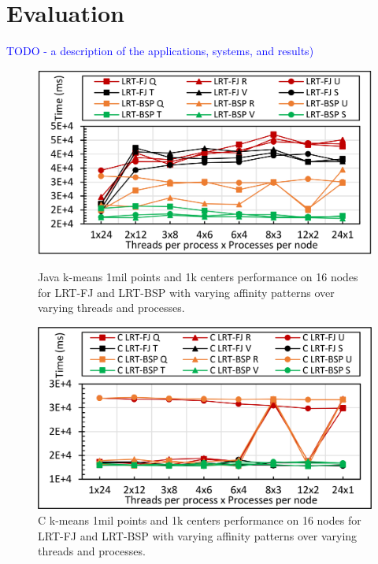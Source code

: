 \documentclass[10pt, conference, compsocconf]{IEEEtran}
\begin{document}
\section{Evaluation} \label{sec:evaluation}
\textcolor{blue}{TODO - a description of the applications, systems, and results)}

\begin{figure}[!htb]
    \centering
    \begin{minipage}{.49\textwidth}
        \centering        
        \includegraphics[width=1\columnwidth]{images/fig_kmeans_1mil_1k_binding_patterns}
        \caption{Java k-means 1mil points and 1k centers performance on 16 nodes for \ac{LRT-FJ} and \ac{LRT-BSP} with varying affinity patterns over varying threads and processes.}
        \label{fig:fig_kmeans_1mil_1k_binding_patterns}
    \end{minipage}
    \hspace{1.4mm}
    \begin{minipage}{0.49\textwidth}
        \centering
        \includegraphics[width=1\columnwidth]{images/fig_C_kmeans_1mil_1k_binding_patterns}
        \caption{C k-means 1mil points and 1k centers performance on 16 nodes for \ac{LRT-FJ} and \ac{LRT-BSP} with varying affinity patterns over varying threads and processes.}
        \label{fig:fig_C_kmeans_1mil_1k_binding_patterns}
    \end{minipage}   
\end{figure}
\end{document}
